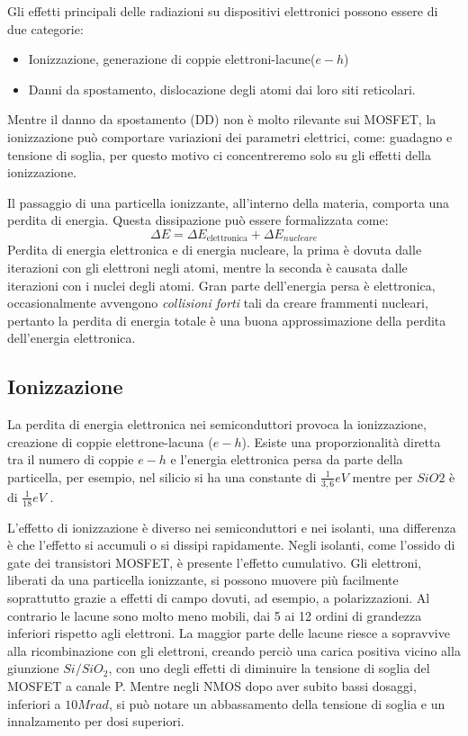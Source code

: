 
Gli effetti principali delle radiazioni su dispositivi elettronici possono essere di due categorie\cite{bib:Effetti_Radiazioni_1987}:
\begin{itemize}
	\item Ionizzazione, generazione di coppie elettroni-lacune($e-h$)
	\item Danni da spostamento, dislocazione degli atomi dai loro siti reticolari.
\end{itemize}
Mentre il danno da spostamento (DD) non è molto rilevante sui MOSFET, la ionizzazione può comportare variazioni dei parametri elettrici, come: guadagno e tensione di soglia, per questo motivo ci concentreremo solo su gli effetti della ionizzazione.

\vspace{0.5cm}

Il passaggio di una particella ionizzante, all'interno della materia, comporta una perdita di energia. Questa dissipazione può essere formalizzata come:
$$ \Delta E = \Delta E_{\text{elettronica}} + \Delta E_{nucleare} $$
Perdita di energia elettronica e di energia nucleare, la prima è dovuta dalle iterazioni con gli elettroni negli atomi, mentre la seconda è causata dalle iterazioni con i nuclei degli atomi.
Gran parte dell'energia persa è elettronica, occasionalmente avvengono \textit{collisioni forti} tali da creare frammenti nucleari, pertanto la perdita di energia totale è una buona approssimazione della perdita dell'energia elettronica\cite{bib:Effetti_Radiazioni_NASA}.

\vspace{0.5cm}

\subsection{Ionizzazione}
La perdita di energia elettronica nei semiconduttori provoca la ionizzazione, creazione di coppie elettrone-lacuna ($e-h$). Esiste una proporzionalità diretta tra il numero di coppie $e-h$ e l'energia elettronica persa da parte della particella, per esempio, nel silicio si ha una constante di $\frac{1}{3,6}eV$ mentre per $SiO2$ è di $\frac{1}{18}eV$ \cite{bib:Effetti_Radiazioni_NASA}.

\vspace{0.5cm}

L'effetto di ionizzazione è diverso nei semiconduttori e nei isolanti, una differenza è che l'effetto si accumuli o si dissipi rapidamente.
Negli isolanti, come l'ossido di gate dei transistori MOSFET, è presente l'effetto cumulativo. Gli elettroni, liberati da una particella ionizzante, si possono muovere più facilmente soprattutto grazie a effetti di campo dovuti, ad esempio, a polarizzazioni.
Al contrario le lacune sono molto meno mobili, dai 5 ai 12 ordini di grandezza inferiori rispetto agli elettroni. La maggior parte delle lacune riesce a sopravvive alla ricombinazione con gli elettroni, creando perciò una carica positiva vicino alla giunzione $Si/SiO_2$, con uno degli effetti di diminuire la tensione di soglia del MOSFET a canale P. Mentre negli NMOS dopo aver subito bassi dosaggi, inferiori a $10Mrad$, si può notare un abbassamento della tensione di soglia e un innalzamento per dosi superiori.



